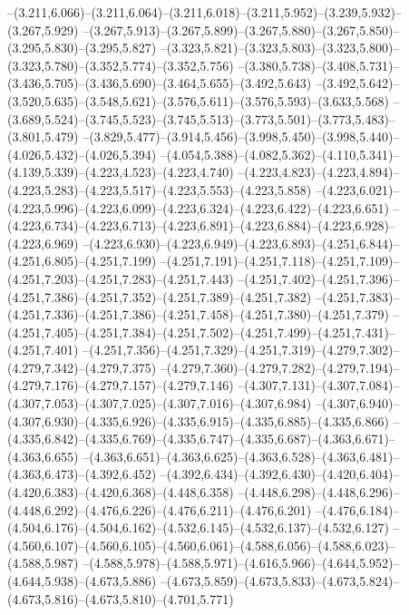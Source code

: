   --(3.211,6.066)--(3.211,6.064)--(3.211,6.018)--(3.211,5.952)--(3.239,5.932)--(3.267,5.929)%
  --(3.267,5.913)--(3.267,5.899)--(3.267,5.880)--(3.267,5.850)--(3.295,5.830)--(3.295,5.827)%
  --(3.323,5.821)--(3.323,5.803)--(3.323,5.800)--(3.323,5.780)--(3.352,5.774)--(3.352,5.756)%
  --(3.380,5.738)--(3.408,5.731)--(3.436,5.705)--(3.436,5.690)--(3.464,5.655)--(3.492,5.643)%
  --(3.492,5.642)--(3.520,5.635)--(3.548,5.621)--(3.576,5.611)--(3.576,5.593)--(3.633,5.568)%
  --(3.689,5.524)--(3.745,5.523)--(3.745,5.513)--(3.773,5.501)--(3.773,5.483)--(3.801,5.479)%
  --(3.829,5.477)--(3.914,5.456)--(3.998,5.450)--(3.998,5.440)--(4.026,5.432)--(4.026,5.394)%
  --(4.054,5.388)--(4.082,5.362)--(4.110,5.341)--(4.139,5.339)--(4.223,4.523)--(4.223,4.740)%
  --(4.223,4.823)--(4.223,4.894)--(4.223,5.283)--(4.223,5.517)--(4.223,5.553)--(4.223,5.858)%
  --(4.223,6.021)--(4.223,5.996)--(4.223,6.099)--(4.223,6.324)--(4.223,6.422)--(4.223,6.651)%
  --(4.223,6.734)--(4.223,6.713)--(4.223,6.891)--(4.223,6.884)--(4.223,6.928)--(4.223,6.969)%
  --(4.223,6.930)--(4.223,6.949)--(4.223,6.893)--(4.251,6.844)--(4.251,6.805)--(4.251,7.199)%
  --(4.251,7.191)--(4.251,7.118)--(4.251,7.109)--(4.251,7.203)--(4.251,7.283)--(4.251,7.443)%
  --(4.251,7.402)--(4.251,7.396)--(4.251,7.386)--(4.251,7.352)--(4.251,7.389)--(4.251,7.382)%
  --(4.251,7.383)--(4.251,7.336)--(4.251,7.386)--(4.251,7.458)--(4.251,7.380)--(4.251,7.379)%
  --(4.251,7.405)--(4.251,7.384)--(4.251,7.502)--(4.251,7.499)--(4.251,7.431)--(4.251,7.401)%
  --(4.251,7.356)--(4.251,7.329)--(4.251,7.319)--(4.279,7.302)--(4.279,7.342)--(4.279,7.375)%
  --(4.279,7.360)--(4.279,7.282)--(4.279,7.194)--(4.279,7.176)--(4.279,7.157)--(4.279,7.146)%
  --(4.307,7.131)--(4.307,7.084)--(4.307,7.053)--(4.307,7.025)--(4.307,7.016)--(4.307,6.984)%
  --(4.307,6.940)--(4.307,6.930)--(4.335,6.926)--(4.335,6.915)--(4.335,6.885)--(4.335,6.866)%
  --(4.335,6.842)--(4.335,6.769)--(4.335,6.747)--(4.335,6.687)--(4.363,6.671)--(4.363,6.655)%
  --(4.363,6.651)--(4.363,6.625)--(4.363,6.528)--(4.363,6.481)--(4.363,6.473)--(4.392,6.452)%
  --(4.392,6.434)--(4.392,6.430)--(4.420,6.404)--(4.420,6.383)--(4.420,6.368)--(4.448,6.358)%
  --(4.448,6.298)--(4.448,6.296)--(4.448,6.292)--(4.476,6.226)--(4.476,6.211)--(4.476,6.201)%
  --(4.476,6.184)--(4.504,6.176)--(4.504,6.162)--(4.532,6.145)--(4.532,6.137)--(4.532,6.127)%
  --(4.560,6.107)--(4.560,6.105)--(4.560,6.061)--(4.588,6.056)--(4.588,6.023)--(4.588,5.987)%
  --(4.588,5.978)--(4.588,5.971)--(4.616,5.966)--(4.644,5.952)--(4.644,5.938)--(4.673,5.886)%
  --(4.673,5.859)--(4.673,5.833)--(4.673,5.824)--(4.673,5.816)--(4.673,5.810)--(4.701,5.771)%
